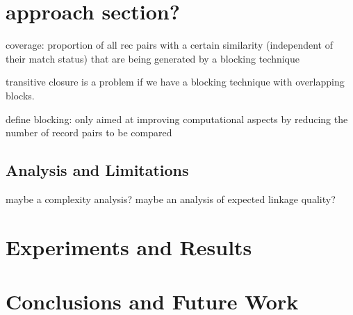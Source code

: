 \documentclass{llncs}
\begin{document}


\section{approach section?}
\label{sec-overview}

coverage: proportion of all rec pairs with a certain similarity
(independent of their match status) that are being generated by
a blocking  technique

transitive closure is a problem if we have a blocking technique with overlapping blocks.

define blocking: only aimed at improving computational aspects by reducing the number of record pairs to be compared










\subsection{Analysis and Limitations}
\label{sec-analysis}

maybe a complexity analysis? maybe an analysis of expected 
linkage quality?


\section{Experiments and Results}
\label{sec-data}



\section{Conclusions and Future Work}
\label{sec-concl}



 
\end{document}
